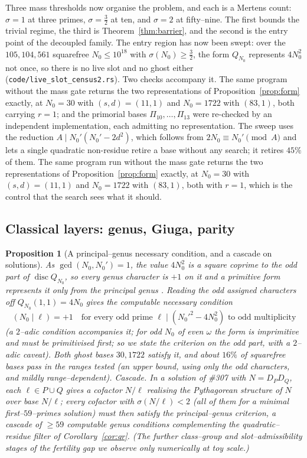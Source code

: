 \documentclass[11pt]{article}
\newtheorem{proposition}[theorem]{Proposition}
\theoremstyle{definition}
\begin{document}
Three mass thresholds now organise the problem, and each is a Mertens count: $\sigma=1$ at three
primes, $\sigma=\tfrac32$ at ten, and $\sigma=2$ at fifty--nine. The first bounds the trivial regime,
the third is Theorem~\ref{thm:barrier}, and the second is the entry point of the decoupled family. The
entry region has now been swept: over the $105{,}104{,}561$ squarefree $N_0\le10^{18}$ with
$\sigma(N_0)\ge\tfrac32$, the form $Q_{N_0}$ represents $4N_0^2$ not once, so there is no live slot
and no ghost either \textup{(\texttt{code/live\_slot\_census2.rs})}. Two checks accompany it. The
same program without the mass gate returns the two representations of Proposition~\ref{prop:form}
exactly, at $N_0=30$ with $(s,d)=(11,1)$ and $N_0=1722$ with $(83,1)$, both carrying $r=1$; and the
primorial bases $\Pi_{10},\dots,\Pi_{13}$ were re-checked by an independent implementation, each
admitting no representation. The sweep uses the reduction $A\mid N_0'(N_0'-2d^2)$, which follows
from $2N_0\equiv N_0'\pmod A$ and lets a single quadratic non-residue retire a base without any
search; it retires $45\%$ of them. The same program run without the
mass gate returns the two representations of Proposition~\ref{prop:form} exactly, at $N_0=30$ with
$(s,d)=(11,1)$ and $N_0=1722$ with $(83,1)$, both with $r=1$, which is the control that the search
sees what it should.

\subsection{Classical layers: genus, Giuga, parity}\label{ssec:classical}

\begin{proposition}[A principal--genus necessary condition, and a cascade on solutions]\label{prop:genus}
As $\gcd(N_0,N_0')=1$, the value $4N_0^2$ is a square coprime to the odd part of $\operatorname{disc}
Q_{N_0}$, so every genus character is $+1$ on it and a primitive form represents it only from the
principal genus \cite{Cox}. Reading the odd assigned characters off $Q_{N_0}(1,1)=4N_0$ gives the
computable necessary condition
\[ (N_0\mid\ell)=+1 \quad\text{for every odd prime }\ell\mid (N_0'^2-4N_0^2)\text{ to odd multiplicity} \]
(a $2$--adic condition accompanies it; for odd $N_0$ of even $\omega$ the form is imprimitive and must be
primitivised first; so we state the criterion on the odd part, with a $2$--adic caveat). Both ghost
bases $30,1722$ satisfy it, and about $16\%$ of squarefree bases pass in the ranges tested (an
\emph{upper bound}, using only the odd characters, and mildly range--dependent). \emph{Cascade.} In a
solution of \#307 with $N=D_PD_Q$, each $\ell\in P\cup Q$ gives a cofactor $N/\ell$ realising the
Pythagorean structure of $N$ over base $N/\ell$; every cofactor with $\sigma(N/\ell)<2$ (all of them
for a minimal first--$59$--primes solution) must then satisfy the principal--genus criterion, a
cascade of $\ge59$ computable genus conditions complementing the quadratic--residue filter of
Corollary~\ref{cor:qr}. \textup{(The further class--group and slot--admissibility stages of the
fertility gap we observe only numerically at toy scale.)}
\end{proposition}
\end{document}
